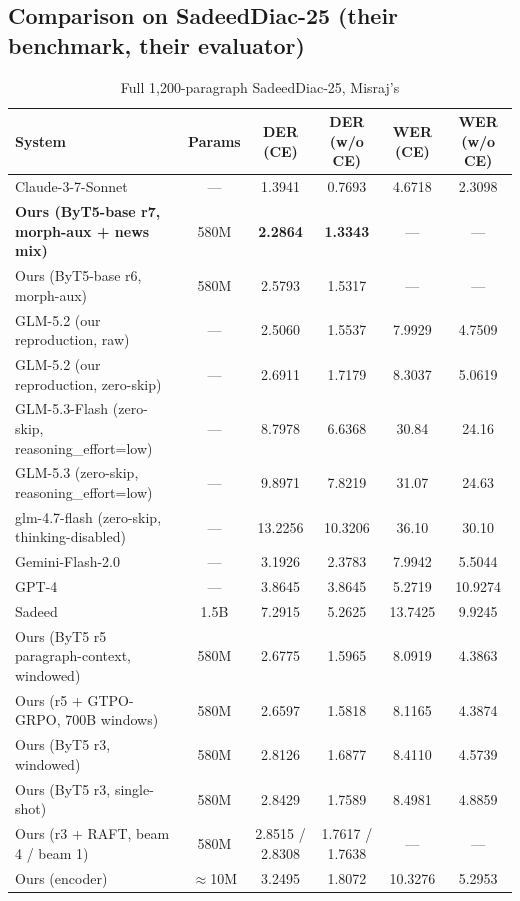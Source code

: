 \documentclass[11pt]{article}
\begin{document}
\subsection{Comparison on SadeedDiac-25 (their benchmark, their evaluator)}
\begin{table}[h]
\centering
\begin{tabular}{lccccc}
\toprule
System & Params & DER (CE) & DER (w/o CE) & WER (CE) & WER (w/o CE) \\
\midrule
Claude-3-7-Sonnet & --- & 1.3941 & 0.7693 & 4.6718 & 2.3098 \\
\textbf{Ours (ByT5-base r7, morph-aux + news mix)} & 580M & \textbf{2.2864} & \textbf{1.3343} & --- & --- \\
Ours (ByT5-base r6, morph-aux) & 580M & 2.5793 & 1.5317 & --- & --- \\
GLM-5.2 (our reproduction, raw) & --- & 2.5060 & 1.5537 & 7.9929 & 4.7509 \\
GLM-5.2 (our reproduction, zero-skip) & --- & 2.6911 & 1.7179 & 8.3037 & 5.0619 \\
GLM-5.3-Flash (zero-skip, reasoning\_effort=low) & --- & 8.7978 & 6.6368 & 30.84 & 24.16 \\
GLM-5.3 (zero-skip, reasoning\_effort=low) & --- & 9.8971 & 7.8219 & 31.07 & 24.63 \\
glm-4.7-flash (zero-skip, thinking-disabled) & --- & 13.2256 & 10.3206 & 36.10 & 30.10 \\
Gemini-Flash-2.0 & --- & 3.1926 & 2.3783 & 7.9942 & 5.5044 \\
GPT-4 & --- & 3.8645 & 3.8645 & 5.2719 & 10.9274 \\
Sadeed & 1.5B & 7.2915 & 5.2625 & 13.7425 & 9.9245 \\
Ours (ByT5 r5 paragraph-context, windowed) & 580M & 2.6775 & 1.5965 & 8.0919 & 4.3863 \\
Ours (r5 + GTPO-GRPO, 700B windows) & 580M & 2.6597 & 1.5818 & 8.1165 & 4.3874 \\
Ours (ByT5 r3, windowed) & 580M & 2.8126 & 1.6877 & 8.4110 & 4.5739 \\
Ours (ByT5 r3, single-shot) & 580M & 2.8429 & 1.7589 & 8.4981 & 4.8859 \\
Ours (r3 + RAFT, beam 4 / beam 1) & 580M & 2.8515 / 2.8308 & 1.7617 / 1.7638 & --- & --- \\
Ours (encoder) & $\approx$10M & 3.2495 & 1.8072 & 10.3276 & 5.2953 \\
\bottomrule
\end{tabular}
\caption{Full 1,200-paragraph SadeedDiac-25, Misraj's
}
\end{table}
\end{document}
